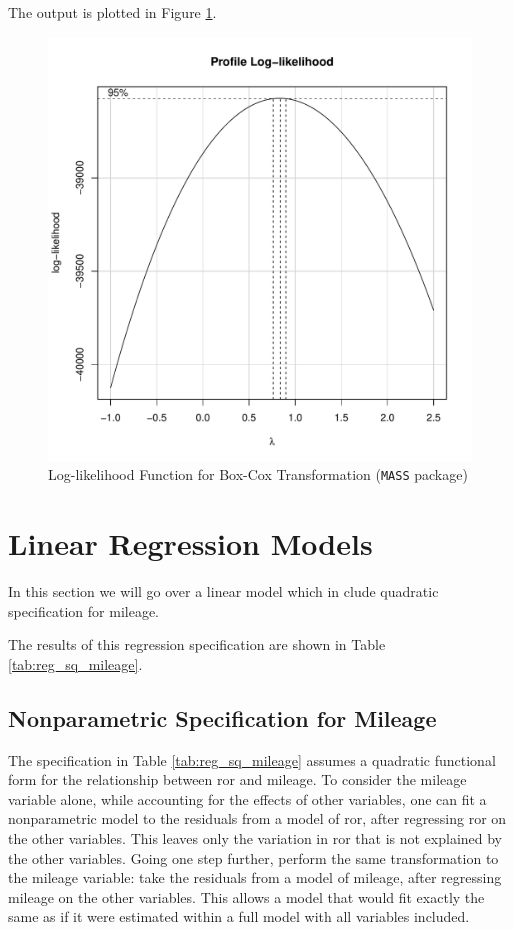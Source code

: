 \documentclass[11pt]{paper}
\begin{document}
The output is plotted in Figure \ref{fig:plot_like_MASS}.

\begin{figure}[h!]
  \centering
  \includegraphics[scale = 0.5, keepaspectratio=true]{../Figures/plot_like_MASS}
  \caption{Log-likelihood Function for Box-Cox Transformation (\texttt{MASS} package)} \label{fig:plot_like_MASS}
\end{figure}


\clearpage

\section{Linear Regression Models }
In this section we will go over a linear model which in clude quadratic specification
for mileage. 

The results of this regression specification are shown in 
Table \ref{tab:reg_sq_mileage}. 
% 

% 
\clearpage
\subsection{Nonparametric Specification for Mileage}


The specification in 
Table \ref{tab:reg_sq_mileage}
assumes a quadratic functional form for
the relationship between ror and mileage. 
To consider the mileage variable alone, 
while accounting for the effects of other variables, 
one can fit a nonparametric model to the residuals 
from a model of ror, 
after regressing ror on the other variables. 
This leaves only the variation in ror that is not explained by the other variables. 
Going one step further, perform the same transformation to the mileage variable:
take the residuals from a model of mileage, 
after regressing mileage on the other variables. 
This allows a model that would fit exactly the same as if it were estimated within a full model with all variables included. 
\end{document}
